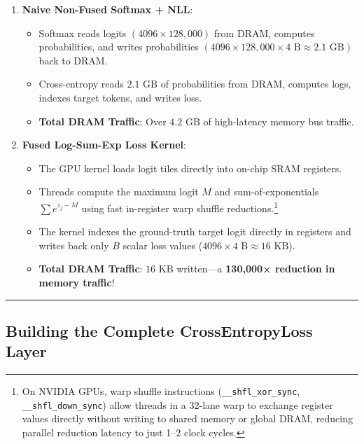 \documentclass[
  letterpaper,
]{scrbook}
\providecommand{\tightlist}{%
  \setlength{\itemsep}{0pt}\setlength{\parskip}{0pt}}
\begin{document}
\begin{enumerate}
\def\labelenumi{\arabic{enumi}.}
\tightlist
\item
  \textbf{Naive Non-Fused Softmax + NLL}:

  \begin{itemize}
  \tightlist
  \item
    Softmax reads logits \((4096 \times 128,000)\) from DRAM, computes
    probabilities, and writes probabilities
    \((4096 \times 128,000 \times 4\text{ B} \approx 2.1\text{ GB})\)
    back to DRAM.
  \item
    Cross-entropy reads \(2.1\text{ GB}\) of probabilities from DRAM,
    computes logs, indexes target tokens, and writes loss.
  \item
    \textbf{Total DRAM Traffic}: Over \(4.2\text{ GB}\) of high-latency
    memory bus traffic.
  \end{itemize}
\item
  \textbf{Fused Log-Sum-Exp Loss Kernel}:

  \begin{itemize}
  \tightlist
  \item
    The GPU kernel loads logit tiles directly into on-chip SRAM
    registers.
  \item
    Threads compute the maximum logit \(M\) and sum-of-exponentials
    \(\sum e^{z_j - M}\) using fast in-register warp shuffle
    reductions.\footnote{On NVIDIA GPUs, warp shuffle instructions
      (\texttt{\_\_shfl\_xor\_sync}, \texttt{\_\_shfl\_down\_sync})
      allow threads in a 32-lane warp to exchange register values
      directly without writing to shared memory or global DRAM, reducing
      parallel reduction latency to just 1--2 clock cycles.}
  \item
    The kernel indexes the ground-truth target logit directly in
    registers and writes back only \(B\) scalar loss values
    (\(4096 \times 4\text{ B} \approx 16\text{ KB}\)).
  \item
    \textbf{Total DRAM Traffic}: \(16\text{ KB}\) written---a
    \textbf{130,000× reduction in memory traffic}!
  \end{itemize}
\end{enumerate}

\begin{center}\rule{0.5\linewidth}{0.5pt}\end{center}

\subsection{Building the Complete CrossEntropyLoss
Layer}\label{building-the-complete-crossentropyloss-layer}
\end{document}
